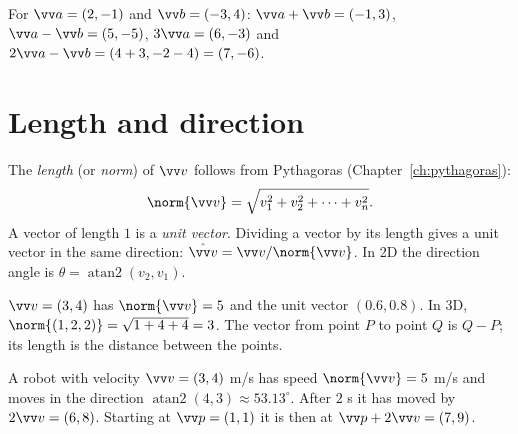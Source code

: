 \begin{center}

\label{fig:b3_3}
\end{center}

\begin{example}
For $\vv a=(2,-1)$ and $\vv b=(-3,4)$: $\vv a+\vv b=(-1,3)$, $\vv a-\vv b=(5,-5)$, $3\vv a=(6,-3)$ and $2\vv a-\vv b=(4+3,-2-4)=(7,-6)$.
\end{example}

\section*{Length and direction}
The \emph{length} (or \emph{norm}) of $\vv v$ follows from Pythagoras (Chapter~\ref{ch:pythagoras}):
\[
\norm{\vv v}=\sqrt{v_1^2+v_2^2+\dots+v_n^2}.
\]
A vector of length $1$ is a \emph{unit vector}. Dividing a vector by its length gives a unit vector in the same direction: $\hat{\vv v}=\vv v/\norm{\vv v}$. In 2D the direction angle is $\theta=\operatorname{atan2}(v_2,v_1)$.

\begin{example}
$\vv v=(3,4)$ has $\norm{\vv v}=5$ and the unit vector $(0.6,0.8)$. In 3D, $\norm{(1,2,2)}=\sqrt{1+4+4}=3$. The vector from point $P$ to point $Q$ is $Q-P$; its length is the distance between the points.
\end{example}

\begin{example}
A robot with velocity $\vv v=(3,4)$ m/s has speed $\norm{\vv v}=5$ m/s and moves in the direction $\operatorname{atan2}(4,3)\approx53.13^\circ$. After $2$ s it has moved by $2\vv v=(6,8)$. Starting at $\vv p=(1,1)$ it is then at $\vv p+2\vv v=(7,9)$.
\end{example}

